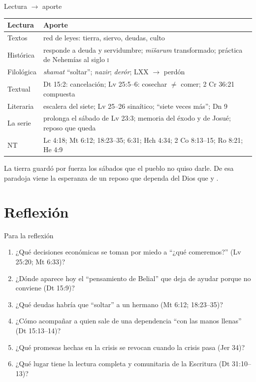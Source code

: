 \begin{frame}{Lectura $\rightarrow$ aporte}
\scriptsize\renewcommand{\arraystretch}{1.15}
\begin{tabular}{@{}L{2.3cm}L{9.7cm}@{}}
\toprule
\textbf{Lectura} & \textbf{Aporte} \\ \midrule
Textos & red de leyes: tierra, siervo, deudas, culto \\
Histórica & responde a deuda y servidumbre; \emph{mīšarum} transformado; práctica de Nehemías al siglo \textsc{i} \\
Filológica & \emph{shamat} ``soltar''; \emph{nazir}; \emph{derór}; LXX  $\rightarrow$ perdón \\
Textual & Dt 15:2: cancelación; Lv 25:5--6: cosechar $\neq$ comer; 2 Cr 36:21 compuesta \\
Literaria & escalera del siete; Lv 25--26 sinaítico; ``siete veces más''; Dn 9 \\
La serie & prolonga el sábado de Lv 23:3; memoria del éxodo y de Josué; reposo que queda \\
NT & Lc 4:18; Mt 6:12; 18:23--35; 6:31; Hch 4:34; 2 Co 8:13--15; Ro 8:21; He 4:9 \\
\bottomrule
\end{tabular}\par\medskip
\small\RaggedRight La tierra guardó por fuerza los sábados que el pueblo no quiso darle. De esa paradoja viene la esperanza de un reposo que dependa del Dios que  y .
\end{frame}

\section{Reflexión}

\begin{frame}{Para la reflexión}
\small
\begin{enumerate}
\item ¿Qué decisiones económicas se toman por miedo a ``¿qué comeremos?'' (Lv 25:20; Mt 6:33)?
\item ¿Dónde aparece hoy el ``pensamiento de Belial'' que deja de ayudar porque no conviene (Dt 15:9)?
\item ¿Qué deudas habría que ``soltar'' a un hermano (Mt 6:12; 18:23--35)?
\item ¿Cómo acompañar a quien sale de una dependencia ``con las manos llenas'' (Dt 15:13--14)?
\item ¿Qué promesas hechas en la crisis se revocan cuando la crisis pasa (Jer 34)?
\item ¿Qué lugar tiene la lectura completa y comunitaria de la Escritura (Dt 31:10--13)?
\end{enumerate}
\end{frame}

